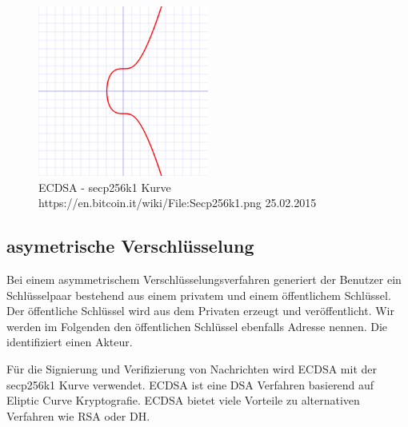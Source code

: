 \documentclass[a4paper,12pt]{report}
\begin{document}
\begin{figure}[ht]
    \centering
    \includegraphics[width=0.50\textwidth]{bilder/Secp256k1.png}
    \caption{ECDSA - secp256k1 Kurve https://en.bitcoin.it/wiki/File:Secp256k1.png 25.02.2015}
\end{figure}

\subsection*{asymetrische Verschlüsselung}
Bei einem asymmetrischem Verschlüsselungsverfahren generiert der Benutzer ein Schlüsselpaar bestehend aus einem privatem und einem öffentlichem Schlüssel. Der öffentliche Schlüssel wird aus dem Privaten erzeugt und veröffentlicht. Wir werden im Folgenden den öffentlichen Schlüssel ebenfalls Adresse nennen. Die identifiziert einen Akteur.

Für die Signierung und Verifizierung von Nachrichten wird ECDSA mit der secp256k1 Kurve verwendet. ECDSA ist eine DSA Verfahren basierend auf Eliptic Curve Kryptografie. ECDSA bietet viele Vorteile zu alternativen Verfahren wie RSA oder DH.\cite{Pouillard2014}
% 
% 
% 
% 
\end{document}
